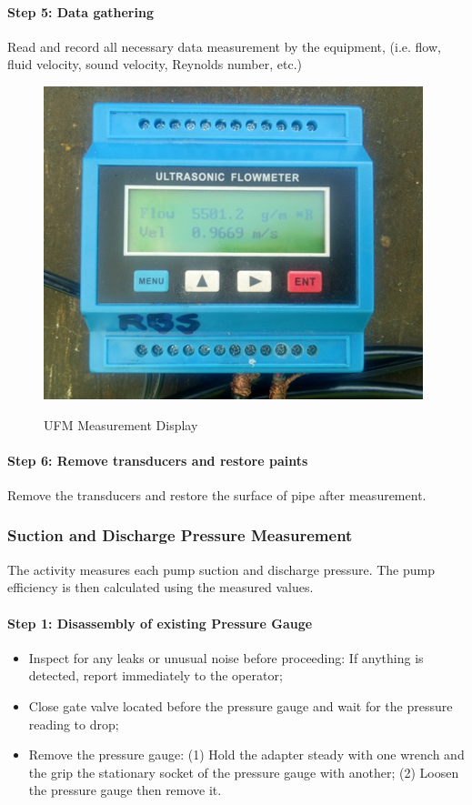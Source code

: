 \paragraph{Step 5: Data gathering}
Read and record all necessary data measurement by the equipment, (i.e. flow, fluid velocity, sound velocity, Reynolds number, etc.) 

\begin{figure}[!htb]
	\includegraphics[scale=1.3]{figures/fig_ch02_flowmeasurement07} \\
	\caption{UFM Measurement Display}
	\label{ch02_flowmeasurement07} 
\end{figure}

\paragraph{Step 6: Remove transducers and restore paints}
Remove the transducers and restore the surface of pipe after measurement.

\subsubsection{Suction and Discharge Pressure Measurement}
The activity measures each pump suction and discharge pressure. The pump efficiency is then calculated using the measured values.

\paragraph{Step 1: Disassembly of existing Pressure Gauge}
\begin{itemize}
\item Inspect for any leaks or unusual noise before proceeding: If anything is detected, report immediately to the operator;
\item 	Close gate valve located before the pressure gauge and wait for the pressure reading to drop;
\item 	Remove the pressure gauge: (1) Hold the adapter steady with one wrench and the grip the stationary socket of the pressure gauge with another; (2) Loosen the pressure gauge then remove it.
\end{itemize}

